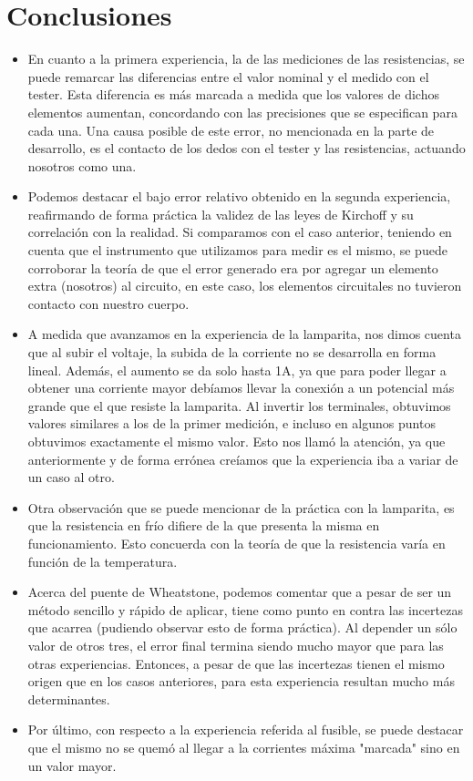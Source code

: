 \documentclass{article}
\begin{document}
\section{Conclusiones}
\begin{itemize}
    \item En cuanto a la primera experiencia, la de las mediciones de las resistencias, se puede remarcar las diferencias entre el valor nominal y el medido con el tester. Esta diferencia es más marcada a medida que los valores de dichos elementos aumentan, concordando con las precisiones que se especifican para cada una. Una causa posible de este error, no mencionada en la parte de desarrollo, es el contacto de los dedos con el tester y las resistencias, actuando nosotros como una.
    \item Podemos destacar el bajo error relativo obtenido en la segunda experiencia, reafirmando de forma práctica la validez de las leyes de Kirchoff y su correlación con la realidad. Si comparamos con el caso anterior, teniendo en cuenta que el instrumento que utilizamos para medir es el mismo, se puede corroborar la teoría de que el error generado era por agregar un elemento extra (nosotros) al circuito, en este caso, los elementos circuitales no tuvieron contacto con nuestro cuerpo.
	\item A medida que avanzamos en la experiencia de la lamparita, nos dimos cuenta que al subir el voltaje,  la subida de la corriente no se desarrolla en forma lineal. Además, el aumento se da solo hasta 1A, ya que para poder llegar a obtener una corriente mayor debíamos llevar la conexión a un potencial más grande que el que resiste la lamparita. Al invertir los terminales, obtuvimos valores similares a los de la primer medición, e incluso en algunos puntos obtuvimos exactamente el mismo valor. Esto nos llamó la atención, ya que anteriormente y de forma errónea creíamos que la experiencia iba a variar de un caso al otro.
    \item Otra observación que se puede mencionar de la práctica con la lamparita, es que la resistencia en frío difiere de la que presenta la misma en funcionamiento. Esto concuerda con la teoría de que la resistencia varía en función de la temperatura.
    \item Acerca del puente de Wheatstone, podemos comentar que a pesar de ser un método sencillo y rápido de aplicar, tiene como punto en contra las incertezas que acarrea (pudiendo observar esto de forma práctica). Al depender un sólo valor de otros tres, el error final termina siendo mucho mayor que para las otras experiencias. Entonces, a pesar de que las incertezas tienen el mismo origen que en los casos anteriores, para esta experiencia resultan mucho más determinantes.
    \item Por último, con respecto a la experiencia referida al fusible, se puede destacar que el mismo no se quemó al llegar a la corrientes máxima "marcada" sino en un valor mayor. 


\end{itemize}
\end{document}

